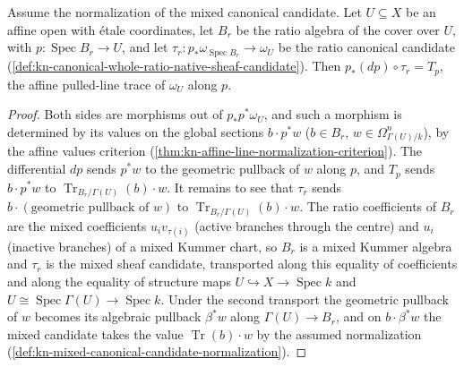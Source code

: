 \begin{lemma}
\label{lem:kn-ratio-sheaf-candidate-differential}
\leanok
Assume the normalization of the mixed canonical candidate. Let $U\subseteq X$
be an affine open with \'etale coordinates, let $B_r$ be the ratio algebra of
the cover over $U$, with $p:\operatorname{Spec}B_r\to U$, and let
$\tau_r:p_*\omega_{\operatorname{Spec}B_r}\to\omega_U$ be the ratio canonical
candidate (\cref{def:kn-canonical-whole-ratio-native-sheaf-candidate}). Then
$p_*(dp)\circ\tau_r=T_p$, the affine pulled-line trace of $\omega_U$ along $p$.
\end{lemma}
\begin{proof}
Both sides are morphisms out of $p_*p^*\omega_U$, and such a morphism is
determined by its values on the global sections $b\cdot p^*w$
($b\in B_r$, $w\in\Omega^n_{\Gamma(U)/k}$), by the affine values criterion
(\cref{thm:kn-affine-line-normalization-criterion}). The differential $dp$
sends $p^*w$ to the geometric pullback of $w$ along $p$, and $T_p$ sends
$b\cdot p^*w$ to $\operatorname{Tr}_{B_r/\Gamma(U)}(b)\cdot w$. It remains to see
that $\tau_r$ sends $b\cdot(\text{geometric pullback of }w)$ to
$\operatorname{Tr}_{B_r/\Gamma(U)}(b)\cdot w$. The ratio coefficients of $B_r$ are
the mixed coefficients $u_iv_{\tau(i)}$ (active branches through the centre)
and $u_i$ (inactive branches) of a mixed Kummer chart, so $B_r$ is a mixed
Kummer algebra and $\tau_r$ is the mixed sheaf candidate, transported along
this equality of coefficients and along the equality of structure maps
$U\hookrightarrow X\to\operatorname{Spec}k$ and
$U\cong\operatorname{Spec}\Gamma(U)\to\operatorname{Spec}k$. Under the second
transport the geometric pullback of $w$ becomes its algebraic pullback
$\beta^*w$ along $\Gamma(U)\to B_r$, and on $b\cdot\beta^*w$ the mixed candidate
takes the value $\operatorname{Tr}(b)\cdot w$ by the assumed normalization
(\cref{def:kn-mixed-canonical-candidate-normalization}).
\end{proof}

